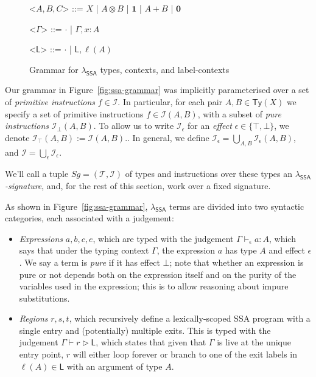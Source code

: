 \documentclass[acmsmall,screen,review]{acmart}
\newcommand{\mc}[1]{\ensuremath{\mathcal{#1}}}
\newcommand{\ms}[1]{\ensuremath{\mathsf{#1}}}
\newcommand{\bhyp}[2]{#1 : #2}
\newcommand{\lhyp}[2]{#1(#2)}
\newcommand{\hasty}[4]{#1 \vdash_{#2} #3: {#4}}
\newcommand{\haslb}[3]{#1 \vdash #2 \rhd #3}
\newcommand{\isotopessa}{\(\lambda_{\ms{SSA}}\)}
\begin{document}
\begin{figure}[H]
  \begin{center}
    \begin{grammar}
      <\(A, B, C\)> ::= 
      \(X\)
      \;|\; \(A \otimes B\)
      \;|\; \(\mathbf{1}\)
      \;|\; \(A + B\)
      \;|\; \(\mathbf{0}\)
      
      <\(\Gamma\)> ::= \(\cdot\) \;|\; \(\Gamma, \bhyp{x}{A}\)

      <\(\ms{L}\)> ::= \(\cdot\) \;|\; \(\ms{L}, \lhyp{\ell}{A}\)
    \end{grammar}
  \end{center}
  \caption{Grammar for \isotopessa{} types, contexts, and label-contexts}
  \Description{}
  \label{fig:ssa-types}
\end{figure}

Our grammar in Figure~\ref{fig:ssa-grammar} was implicitly parameterised over a set of
\emph{primitive instructions} $f \in \mc{I}$. In particular, for each pair $A, B \in \ms{Ty}(X)$ we
specify a set of primitive instructions $f \in \mc{I}(A, B)$, with a subset of \emph{pure
instructions} $\mc{I}_\bot(A, B)$. To allow us to write $\mc{I}_\epsilon$ for an \emph{effect}
$\epsilon \in \{\top, \bot\}$, we denote $\mc{I}_\top(A, B) := \mc{I}(A, B)$.. In general, we define
$\mc{I}_\epsilon = \bigcup_{A, B}\mc{I}_\epsilon(A, B)$, and $\mc{I} =
\bigcup_\epsilon\mc{I}_\epsilon$. 

We'll call a tuple $Sg = (\mc{T}, \mc{I})$ of types and instructions over these types an
\emph{\isotopessa{}-signature}, and, for the rest of this section, work over a fixed signature.
 

As shown in Figure~\ref{fig:ssa-grammar}, \isotopessa{} terms are divided into two syntactic
categories, each associated with a judgement:
\begin{itemize}
  \item \emph{Expressions} $a, b, c, e$, which are typed with the judgement
  $\hasty{\Gamma}{\epsilon}{a}{A}$, which says that under the typing context $\Gamma$, the
  expression $a$ has type $A$ and effect $\epsilon$. We say a term is \emph{pure} if it has effect
  $\bot$; note that whether an expression is pure or not depends both on the expression itself and
  on the purity of the variables used in the expression; this is to allow reasoning about impure
  substitutions.
  \item \emph{Regions} $r, s, t$, which recursively define a lexically-scoped SSA program with a
  single entry and (potentially) multiple exits. This is typed with the judgement
  $\haslb{\Gamma}{r}{\ms{L}}$, which states that given that $\Gamma$ is live at the unique entry
  point, $r$ will either loop forever or branch to one of the exit labels in $\ell(A) \in \ms{L}$
  with an argument of type $A$.
\end{itemize}
\end{document}
